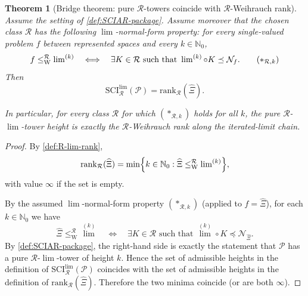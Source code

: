 \documentclass{lmcs} %
\theoremstyle{plain}
\theoremstyle{plain}
\newtheorem{theorem}{Theorem}[section]
\theoremstyle{definition}
\theoremstyle{remark}
\theoremstyle{definition}
\theoremstyle{remark}
\numberwithin{equation}{section}
\newcommand{\Lim}{\operatorname{lim}}
\newcommand{\Limi}[1]{\Lim^{(#1)}}
\begin{document}
\begin{theorem}[Bridge theorem: pure $\mathcal R$-towers coincide with $\mathcal R$-Weihrauch rank]\label{thm:equivalence}
Assume the setting of \cref{def:SCIAR-package}. Assume moreover that the chosen
class $\mathcal R$ has the following \textit{$\Lim$-normal-form property}:
for every single-valued problem $f$ between represented spaces and every
$k\in\mathbb N_0$,
\[
f \le_{\mathrm W}^{\mathcal R} \Limi{k}
\quad\Longleftrightarrow\quad
\exists K\in\mathcal R \text{ such that } \Limi{k} \circ K \preceq \mathcal N_f.
\tag{$\ast_{\mathcal R,k}$}
\]
Then
\[
\mathrm{SCI}^{\Lim}_\mathcal R (\mathcal P) = \mathrm{rank}_{\mathcal R}(\widehat{\Xi}).
\]

In particular, for every class $\mathcal R$ for which $(\ast_{\mathcal R,k})$ holds for
all $k$, the pure $\mathcal R$-$\Lim$-tower height is exactly the $\mathcal R$-Weihrauch rank along the
iterated-limit chain.
\end{theorem}
\begin{proof}
By \cref{def:R-lim-rank},
\[
\mathrm{rank}_{\mathcal R}(\widehat{\Xi})
=
\min\Bigl\{ k\in\mathbb N_0 :
\widehat{\Xi} \le_{\mathrm W}^{\mathcal R} \Limi{k} \Bigr\},
\]
with value $\infty$ if the set is empty.

By the assumed $\Lim$-normal-form property $(\ast_{\mathcal R,k})$ (applied to $f=\widehat{\Xi}$), for each
$k\in\mathbb N_0$ we have
\[
\widehat{\Xi} \le_{\mathrm W}^{\mathcal R} \Limi{k}
\quad\Longleftrightarrow\quad
\exists K\in\mathcal R\text{ such that } \Limi{k} \circ K \preceq \mathcal N_{\widehat{\Xi}}.
\]
By \cref{def:SCIAR-package}, the right-hand side is exactly the statement that
$\mathcal{P}$ has a pure $\mathcal R$-$\Lim$-tower of height $k$.
Hence the set of admissible heights in the definition of
$\mathrm{SCI}^{\Lim}_\mathcal R(\mathcal{P})$ coincides with the set of admissible heights in the
definition of $\mathrm{rank}_{\mathcal R}(\widehat{\Xi})$.
Therefore the two minima coincide (or are both $\infty$).
\end{proof}
\end{document}

